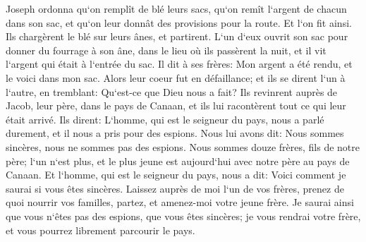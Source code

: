 \verse Joseph ordonna qu`on remplît de blé leurs sacs, qu`on remît l`argent de chacun dans son sac, et qu`on leur donnât des provisions pour la route. Et l`on fit ainsi. 
\verse Ils chargèrent le blé sur leurs ânes, et partirent. 
\verse L`un d`eux ouvrit son sac pour donner du fourrage à son âne, dans le lieu où ils passèrent la nuit, et il vit l`argent qui était à l`entrée du sac. 
\verse Il dit à ses frères: Mon argent a été rendu, et le voici dans mon sac. Alors leur coeur fut en défaillance; et ils se dirent l`un à l`autre, en tremblant: Qu`est-ce que Dieu nous a fait? 
\verse Ils revinrent auprès de Jacob, leur père, dans le pays de Canaan, et ils lui racontèrent tout ce qui leur était arrivé. Ils dirent: 
\verse L`homme, qui est le seigneur du pays, nous a parlé durement, et il nous a pris pour des espions. 
\verse Nous lui avons dit: Nous sommes sincères, nous ne sommes pas des espions. 
\verse Nous sommes douze frères, fils de notre père; l`un n`est plus, et le plus jeune est aujourd`hui avec notre père au pays de Canaan. 
\verse Et l`homme, qui est le seigneur du pays, nous a dit: Voici comment je saurai si vous êtes sincères. Laissez auprès de moi l`un de vos frères, prenez de quoi nourrir vos familles, partez, et amenez-moi votre jeune frère. 
\verse Je saurai ainsi que vous n`êtes pas des espions, que vous êtes sincères; je vous rendrai votre frère, et vous pourrez librement parcourir le pays. 
